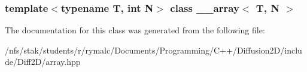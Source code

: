 \subsubsection*{template$<$typename T, int N$>$ class \_\-\_\-array$<$ T, N $>$}



The documentation for this class was generated from the following file:\begin{DoxyCompactItemize}
\item 
/nfs/stak/students/r/rymalc/Documents/Programming/C++/Diffusion2D/include/Diff2D/array.hpp\end{DoxyCompactItemize}
